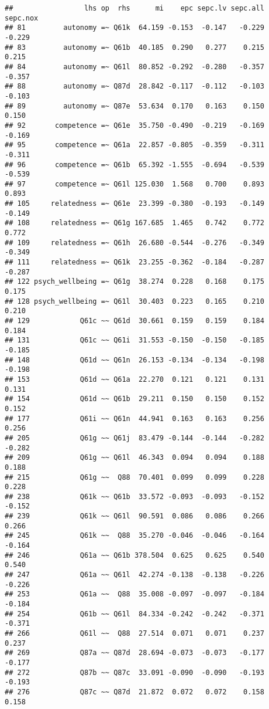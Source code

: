 \documentclass[
]{article}
\begin{document}
\begin{verbatim}
##                 lhs op  rhs      mi    epc sepc.lv sepc.all sepc.nox
## 81         autonomy =~ Q61k  64.159 -0.153  -0.147   -0.229   -0.229
## 83         autonomy =~ Q61b  40.185  0.290   0.277    0.215    0.215
## 84         autonomy =~ Q61l  80.852 -0.292  -0.280   -0.357   -0.357
## 88         autonomy =~ Q87d  28.842 -0.117  -0.112   -0.103   -0.103
## 89         autonomy =~ Q87e  53.634  0.170   0.163    0.150    0.150
## 92       competence =~ Q61e  35.750 -0.490  -0.219   -0.169   -0.169
## 95       competence =~ Q61a  22.857 -0.805  -0.359   -0.311   -0.311
## 96       competence =~ Q61b  65.392 -1.555  -0.694   -0.539   -0.539
## 97       competence =~ Q61l 125.030  1.568   0.700    0.893    0.893
## 105     relatedness =~ Q61e  23.399 -0.380  -0.193   -0.149   -0.149
## 108     relatedness =~ Q61g 167.685  1.465   0.742    0.772    0.772
## 109     relatedness =~ Q61h  26.680 -0.544  -0.276   -0.349   -0.349
## 111     relatedness =~ Q61k  23.255 -0.362  -0.184   -0.287   -0.287
## 122 psych_wellbeing =~ Q61g  38.274  0.228   0.168    0.175    0.175
## 128 psych_wellbeing =~ Q61l  30.403  0.223   0.165    0.210    0.210
## 129            Q61c ~~ Q61d  30.661  0.159   0.159    0.184    0.184
## 131            Q61c ~~ Q61i  31.553 -0.150  -0.150   -0.185   -0.185
## 148            Q61d ~~ Q61n  26.153 -0.134  -0.134   -0.198   -0.198
## 153            Q61d ~~ Q61a  22.270  0.121   0.121    0.131    0.131
## 154            Q61d ~~ Q61b  29.211  0.150   0.150    0.152    0.152
## 177            Q61i ~~ Q61n  44.941  0.163   0.163    0.256    0.256
## 205            Q61g ~~ Q61j  83.479 -0.144  -0.144   -0.282   -0.282
## 209            Q61g ~~ Q61l  46.343  0.094   0.094    0.188    0.188
## 215            Q61g ~~  Q88  70.401  0.099   0.099    0.228    0.228
## 238            Q61k ~~ Q61b  33.572 -0.093  -0.093   -0.152   -0.152
## 239            Q61k ~~ Q61l  90.591  0.086   0.086    0.266    0.266
## 245            Q61k ~~  Q88  35.270 -0.046  -0.046   -0.164   -0.164
## 246            Q61a ~~ Q61b 378.504  0.625   0.625    0.540    0.540
## 247            Q61a ~~ Q61l  42.274 -0.138  -0.138   -0.226   -0.226
## 253            Q61a ~~  Q88  35.008 -0.097  -0.097   -0.184   -0.184
## 254            Q61b ~~ Q61l  84.334 -0.242  -0.242   -0.371   -0.371
## 266            Q61l ~~  Q88  27.514  0.071   0.071    0.237    0.237
## 269            Q87a ~~ Q87d  28.694 -0.073  -0.073   -0.177   -0.177
## 272            Q87b ~~ Q87c  33.091 -0.090  -0.090   -0.193   -0.193
## 276            Q87c ~~ Q87d  21.872  0.072   0.072    0.158    0.158
\end{verbatim}
\end{document}
